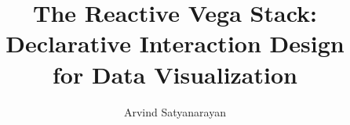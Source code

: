 \documentclass[12pt]{report}
\begin{document}
\title{The Reactive Vega Stack:\\Declarative Interaction Design\\for Data
Visualization}
\author{Arvind Satyanarayan}

\tablespagefalse

\beforepreface


\afterpreface











\end{document}
